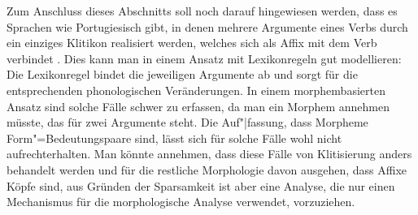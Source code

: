 

Zum Anschluss dieses Abschnitts soll noch darauf hingewiesen werden,
dass es Sprachen wie Portugiesisch gibt, in denen mehrere Argumente eines Verbs
durch ein einziges Klitikon realisiert werden, welches sich als Affix mit dem Verb
verbindet \citep[Kapitel~2.1.1.4 und S.\,169--171]{Crysmann2002a}. 
Dies kann man in einem Ansatz mit Lexikonregeln gut modellieren: Die Lexikonregel bindet die jeweiligen
Argumente ab und sorgt für die entsprechenden phonologischen Veränderungen. In einem morphembasierten
Ansatz sind solche Fälle schwer zu erfassen, da man ein Morphem annehmen müsste, das für zwei Argumente
steht. Die Auf"|fassung, dass Morpheme Form"=Bedeutungspaare sind, lässt sich für solche Fälle wohl nicht
aufrechterhalten.
Man könnte annehmen, dass diese Fälle von Klitisierung anders behandelt werden und für die
restliche Morphologie davon ausgehen, dass Affixe Köpfe sind, aus Gründen der Sparsamkeit ist aber
eine Analyse, die nur einen Mechanismus für die morphologische Analyse verwendet, vorzuziehen.%

